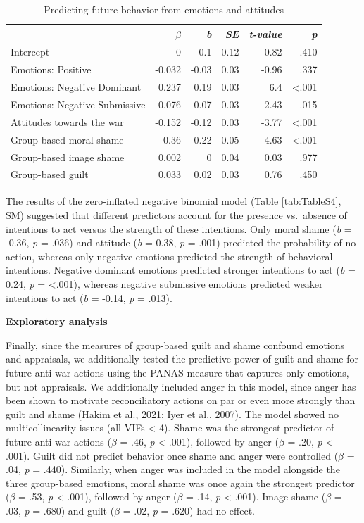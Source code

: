 \documentclass[
]{article}
\begin{document}
\begin{table}[H]
\centering
\caption{\label{tab:Table3}Predicting future behavior from emotions and attitudes
}
\centering
\fontsize{8}{10}\selectfont
\begin{tabular}[t]{lrrrrr}
\toprule
\em{ } & \em{$\beta$} & \em{b} & \em{SE} & \em{t-value} & \em{p}\\
\midrule
Intercept & 0 & -0.1 & 0.12 & -0.82 & .410\\
Emotions: Positive & -0.032 & -0.03 & 0.03 & -0.96 & .337\\
Emotions: Negative Dominant & 0.237 & 0.19 & 0.03 & 6.4 & <.001\\
Emotions: Negative Submissive & -0.076 & -0.07 & 0.03 & -2.43 & .015\\
Attitudes towards the war & -0.152 & -0.12 & 0.03 & -3.77 & <.001\\
\addlinespace
Group-based moral shame & 0.36 & 0.22 & 0.05 & 4.63 & <.001\\
Group-based image shame & 0.002 & 0 & 0.04 & 0.03 & .977\\
Group-based guilt & 0.033 & 0.02 & 0.03 & 0.76 & .450\\
\bottomrule
\end{tabular}
\end{table}

The results of the zero-inflated negative binomial model (Table \ref{tab:TableS4}, SM) suggested that different predictors account for the presence vs.~absence of intentions to act versus the strength of these intentions. Only moral shame (\emph{b} = -0.36, \emph{p} = .036) and attitude (\emph{b} = 0.38, \emph{p} = .001) predicted the probability of no action, whereas only negative emotions predicted the strength of behavioral intentions. Negative dominant emotions predicted stronger intentions to act (\emph{b} = 0.24, \emph{p} = \textless.001), whereas negative submissive emotions predicted weaker intentions to act (\emph{b} = -0.14, \emph{p} = .013).

\textbf{Exploratory analysis}

Finally, since the measures of group-based guilt and shame confound emotions and appraisals, we additionally tested the predictive power of guilt and shame for future anti-war actions using the PANAS measure that captures only emotions, but not appraisals. We additionally included anger in this model, since anger has been shown to motivate reconciliatory actions on par or even more strongly than guilt and shame (Hakim et al., 2021; Iyer et al., 2007). The model showed no multicollinearity issues (all VIFs \textless{} 4). Shame was the strongest predictor of future anti-war actions (\(\beta\) = .46, \emph{p} \textless{} .001), followed by anger (\(\beta\) = .20, \emph{p} \textless{} .001). Guilt did not predict behavior once shame and anger were controlled (\(\beta\) = .04, \emph{p} = .440). Similarly, when anger was included in the model alongside the three group-based emotions, moral shame was once again the strongest predictor (\(\beta\) = .53, \emph{p} \textless{} .001), followed by anger (\(\beta\) = .14, \emph{p} \textless{} .001). Image shame (\(\beta\) = .03, \emph{p} = .680) and guilt (\(\beta\) = .02, \emph{p} = .620) had no effect.
\end{document}
